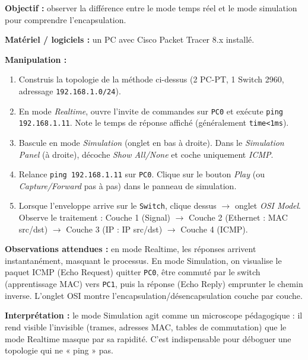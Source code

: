 \documentclass[11pt]{article}
\begin{document}
\begin{experience}
\textbf{Objectif :} observer la différence entre le mode temps réel et le mode simulation pour comprendre l'encapsulation.\par
\textbf{Matériel / logiciels :} un PC avec Cisco Packet Tracer 8.x installé.\par
\textbf{Manipulation :}
\begin{enumerate}
    \item Construis la topologie de la méthode ci-dessus (2 PC-PT, 1 Switch 2960, adressage \texttt{192.168.1.0/24}).
    \item En mode \emph{Realtime}, ouvre l'invite de commandes sur \texttt{PC0} et exécute \texttt{ping 192.168.1.11}. Note le temps de réponse affiché (généralement \texttt{time<1ms}).
    \item Bascule en mode \emph{Simulation} (onglet en bas à droite). Dans le \emph{Simulation Panel} (à droite), décoche \emph{Show All/None} et coche uniquement \emph{ICMP}.
    \item Relance \texttt{ping 192.168.1.11} sur \texttt{PC0}. Clique sur le bouton \emph{Play} (ou \emph{Capture/Forward} pas à pas) dans le panneau de simulation.
    \item Lorsque l'enveloppe arrive sur le \texttt{Switch}, clique dessus $\rightarrow$ onglet \emph{OSI Model}. Observe le traitement : Couche 1 (Signal) $\rightarrow$ Couche 2 (Ethernet : MAC src/dst) $\rightarrow$ Couche 3 (IP : IP src/dst) $\rightarrow$ Couche 4 (ICMP).
\end{enumerate}
\textbf{Observations attendues :} en mode Realtime, les réponses arrivent instantanément, masquant le processus. En mode Simulation, on visualise le paquet ICMP (Echo Request) quitter \texttt{PC0}, être commuté par le switch (apprentissage MAC) vers \texttt{PC1}, puis la réponse (Echo Reply) emprunter le chemin inverse. L'onglet OSI montre l'encapsulation/désencapsulation couche par couche.\par
\textbf{Interprétation :} le mode Simulation agit comme un microscope pédagogique : il rend visible l'invisible (trames, adresses MAC, tables de commutation) que le mode Realtime masque par sa rapidité. C'est indispensable pour déboguer une topologie qui ne « ping » pas.
\end{experience}
\end{document}
